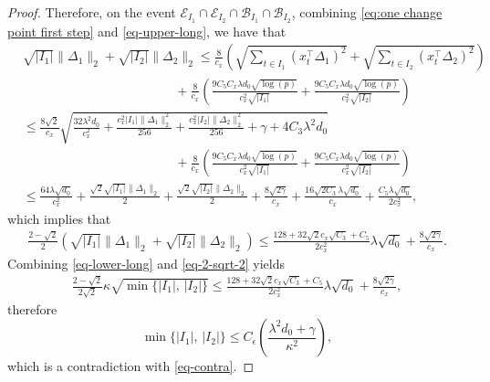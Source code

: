 \documentclass[twoside]{article}
\begin{document}
\begin{proof}
Therefore, on the event $\mathcal{E}_{I_1} \cap \mathcal{E}_{I_2} \cap \mathcal{B}_{I_1} \cap \mathcal{B}_{I_2}$, combining \eqref{eq:one change point first step} and \eqref{eq-upper-long},  we have that
	\begin{align*}
		&  \sqrt{|I_1|} \|\Delta_1\|_2 + \sqrt{|I_2|} \|\Delta_2\|_2 \leq \frac{8}{c_x} \left(\sqrt{\sum_{t \in I_1} (x_t^{\top}\Delta_1)^2} + \sqrt{\sum_{t \in I_2} (x_t^{\top}\Delta_2)^2} \right) \\
		& \hspace{5cm} + \frac{8}{c_x}\left(\frac{9C_5 C_x\lambda d_0 \sqrt{\log(p)} }{c_x^2 \sqrt{|I_1|}} + \frac{9C_5 C_x\lambda d_0 \sqrt{\log(p)} }{c_x^2 \sqrt{|I_2|}}\right) \\
		& \leq \frac{8\sqrt{2}}{c_x} \sqrt{\frac{32 \lambda^2 d_0}{c_x^2} + \frac{c_x^2 |I_1| \|\Delta_1\|_2^2}{256} + \frac{c_x^2 |I_2| \|\Delta_2\|_2^2}{256} + \gamma + 4C_3 \lambda^2 d_0} \\
		& \hspace{5cm} + \frac{8}{c_x}\left(\frac{9C_5 C_x\lambda d_0 \sqrt{\log(p)} }{c_x^2 \sqrt{|I_1|}} + \frac{9C_5 C_x\lambda d_0 \sqrt{\log(p)} }{c_x^2 \sqrt{|I_2|}}\right)  \\
		& \leq \frac{64\lambda \sqrt{d_0}}{c_x^2} + \frac{\sqrt{2} \sqrt{|I_1|}\|\Delta_1\|_2}{2} + \frac{\sqrt{2} \sqrt{|I_2|}\|\Delta_2\|_2}{2} + 	\frac{8\sqrt{2\gamma}}{c_x}	+ \frac{16\sqrt{2C_3} \lambda \sqrt{d_0}}{c_x} + \frac{C_5\lambda \sqrt{d_0}}{2c_x^2},
	\end{align*}
	which implies that
	\begin{align}\label{eq-2-sqrt-2}
		\frac{2 - \sqrt{2}}{2} \left(\sqrt{|I_1|} \|\Delta_1\|_2 + \sqrt{|I_2|} \|\Delta_2\|_2 \right) \leq \frac{128 + 32\sqrt{2}c_x\sqrt{C_3} + C_5}{2c_x^2} \lambda\sqrt{d_0} + 	\frac{8\sqrt{2\gamma}}{c_x}.
	\end{align}
	Combining \eqref{eq-lower-long} and \eqref{eq-2-sqrt-2} yields
	\begin{align*}
		\frac{2 - \sqrt{2}}{2\sqrt{2}}\kappa \sqrt{\min\{|I_1|, \, |I_2|\}} \leq \frac{128 + 32\sqrt{2}c_x\sqrt{C_3} + C_5}{2c_x^2} \lambda\sqrt{d_0} + 	\frac{8\sqrt{2\gamma}}{c_x},	 
	\end{align*}
	therefore
	\[
		\min\{|I_1|, \, |I_2|\} \leq C_{\epsilon} \left(\frac{\lambda^2 d_0 + \gamma}{\kappa^2}\right),
	\]
	which is a contradiction with \eqref{eq-contra}.
\end{proof}
\end{document}
